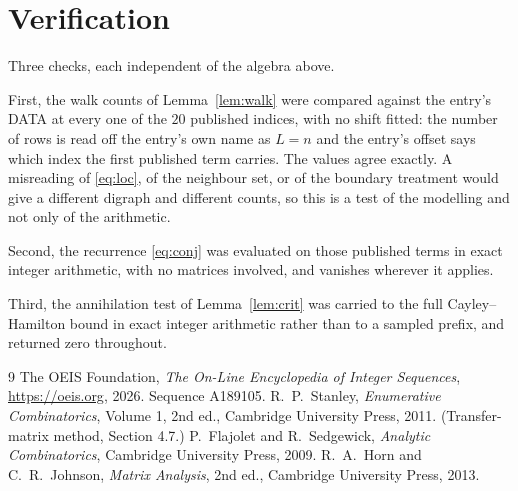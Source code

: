 \documentclass[11pt,a4paper]{article}
\theoremstyle{plain}
\theoremstyle{definition}
\begin{document}
\section{Verification}

Three checks, each independent of the algebra above.

First, the walk counts of Lemma~\ref{lem:walk} were compared against the entry's DATA at
every one of the $20$ published indices, with no shift fitted: the number of rows is
read off the entry's own name as $L=n$ and the entry's offset says which index the first
published term carries. The values agree exactly. A misreading of \eqref{eq:loc}, of the
neighbour set, or of the boundary treatment would give a different digraph and different
counts, so this is a test of the modelling and not only of the arithmetic.

Second, the recurrence \eqref{eq:conj} was evaluated on those published terms in exact
integer arithmetic, with no matrices involved, and vanishes wherever it applies.

Third, the annihilation test of Lemma~\ref{lem:crit} was carried to the full
Cayley--Hamilton bound in exact integer arithmetic rather than to a sampled prefix, and
returned zero throughout.

\begin{thebibliography}{9}
 The OEIS Foundation, \emph{The On-Line Encyclopedia of Integer
Sequences}, \url{https://oeis.org}, 2026. Sequence A189105.
 R.~P.~Stanley, \emph{Enumerative Combinatorics}, Volume 1, 2nd ed.,
Cambridge University Press, 2011. (Transfer-matrix method, Section 4.7.)
 P.~Flajolet and R.~Sedgewick, \emph{Analytic Combinatorics}, Cambridge
University Press, 2009.
 R.~A.~Horn and C.~R.~Johnson, \emph{Matrix Analysis}, 2nd ed., Cambridge
University Press, 2013.
\end{thebibliography}
\end{document}
